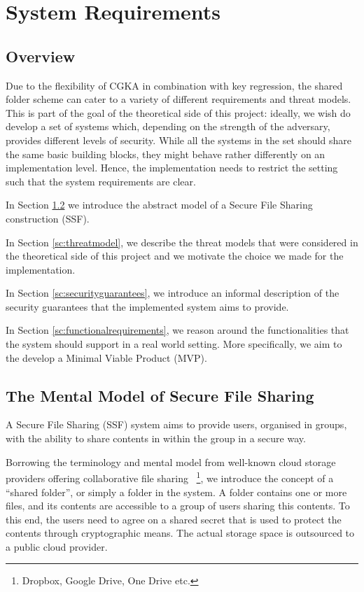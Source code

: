 \chapter{System Requirements}\label{ch:system-requirements}

\section{Overview}

Due to the flexibility of CGKA in combination with key regression, 
the shared folder scheme can cater to a variety of different requirements and threat models.
This is part of the goal of the theoretical side of this
project: ideally, we wish do develop a set of systems which, depending on the strength of the adversary,
provides different levels of security. While all the systems in the set should share the same basic building
blocks, they might behave rather differently on an implementation level. Hence, the implementation
needs to restrict the setting such that the system requirements are clear.

In Section \cref{sc:mentalmodel} we introduce the abstract model of a Secure File Sharing construction (SSF).

In Section \cref{sc:threatmodel}, we describe the threat models that were considered in the theoretical side of this project
and we motivate the choice we made for the implementation. 

In Section \cref{sc:securityguarantees}, we introduce an informal description of the security guarantees 
that the implemented system aims to provide.

In Section \cref{sc:functionalrequirements}, we reason around the functionalities that the system should support in a real world setting.
More specifically, we aim to the develop a Minimal Viable Product (MVP).

\section{The Mental Model of Secure File Sharing} \label{sc:mentalmodel}

A Secure File Sharing (SSF) system aims to provide users, organised in groups, 
with the ability to share contents in within the group in a secure way.

Borrowing the terminology and mental model from well-known cloud storage providers offering collaborative file sharing
~\footnote{Dropbox, Google Drive, One Drive etc.},
we introduce the concept of a ``shared folder'', or simply a folder in the system.
A folder contains one or more files, and its contents are accessible to a group of users sharing this contents.
To this end, the users need to agree on a shared secret that is used to protect the contents through cryptographic means.
The actual storage space is outsourced to a public cloud provider.

